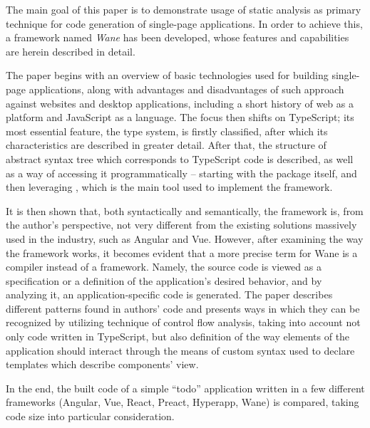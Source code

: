 The main goal of this paper is to demonstrate usage of static analysis as primary technique for code generation of single-page applications.
In order to achieve this, a framework named \textit{Wane} has been developed, whose features and capabilities are herein described in detail.

The paper begins with an overview of basic technologies used for building single-page applications, along with advantages and disadvantages of such approach against websites and desktop applications, including a short history of web as a platform and JavaScript as a language.
The focus then shifts on TypeScript; its most essential feature, the type system, is firstly classified, after which its characteristics are described in greater detail.
After that, the structure of abstract syntax tree which corresponds to TypeScript code is described, as well as a way of accessing it programmatically -- starting with the package  itself, and then leveraging , which is the main tool used to implement the framework.

It is then shown that, both syntactically and semantically, the framework is, from the author's perspective, not very different from the existing solutions massively used in the industry, such as Angular and Vue.
However, after examining the way the framework works, it becomes evident that a more precise term for Wane is a compiler instead of a framework.
Namely, the source code is viewed as a specification or a definition of the application's desired behavior, and by analyzing it, an application-specific code is generated.
The paper describes different patterns found in authors' code and presents ways in which they can be recognized by utilizing technique of control flow analysis, taking into account not only code written in TypeScript, but also definition of the way elements of the application should interact through the means of custom syntax used to declare templates which describe components' view.

In the end, the built code of a simple ``todo'' application written in a few different frameworks (Angular, Vue, React, Preact, Hyperapp, Wane) is compared, taking code size into particular consideration.
